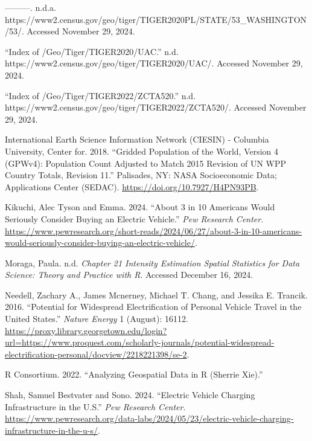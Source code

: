 \documentclass[
  letterpaper,
  DIV=11,
  numbers=noendperiod]{scrartcl}
\newlength{\cslhangindent}
\newenvironment{CSLReferences}[2] %
 {\begin{list}{}{%
  \setlength{\itemindent}{0pt}
  \setlength{\leftmargin}{0pt}
  \setlength{\parsep}{0pt}
  \ifodd #1
   \setlength{\leftmargin}{\cslhangindent}
   \setlength{\itemindent}{-1\cslhangindent}
  \fi
  \setlength{\itemsep}{#2\baselineskip}}}
 {\end{list}}
\begin{document}
\begin{CSLReferences}{1}{0}
---------. n.d.a.
https://www2.census.gov/geo/tiger/TIGER2020PL/STATE/53\_WASHINGTON/53/.
Accessed November 29, 2024.

{``Index of /Geo/Tiger/{TIGER2020}/{UAC}.''} n.d.
https://www2.census.gov/geo/tiger/TIGER2020/UAC/. Accessed November 29,
2024.

{``Index of /Geo/Tiger/{TIGER2022}/{ZCTA520}.''} n.d.
https://www2.census.gov/geo/tiger/TIGER2022/ZCTA520/. Accessed November
29, 2024.

International Earth Science Information Network (CIESIN) - Columbia
University, Center for. 2018. {``Gridded Population of the World,
Version 4 (GPWv4): Population Count Adjusted to Match 2015 Revision of
UN WPP Country Totals, Revision 11.''} Palisades, NY: NASA Socioeconomic
Data; Applications Center (SEDAC).
\url{https://doi.org/10.7927/H4PN93PB}.

Kikuchi, Alec Tyson and Emma. 2024. {``About 3 in 10 {Americans} Would
Seriously Consider Buying an Electric Vehicle.''} \emph{Pew Research
Center}.
\url{https://www.pewresearch.org/short-reads/2024/06/27/about-3-in-10-americans-would-seriously-consider-buying-an-electric-vehicle/}.

Moraga, Paula. n.d. \emph{Chapter 21 {Intensity} Estimation {\textbar}
{Spatial Statistics} for {Data Science}: {Theory} and {Practice} with
{R}}. Accessed December 16, 2024.

Needell, Zachary A., James Mcnerney, Michael T. Chang, and Jessika E.
Trancik. 2016. {``Potential for Widespread Electrification of Personal
Vehicle Travel in the United States.''} \emph{Nature Energy} 1 (August):
16112.
\url{https://proxy.library.georgetown.edu/login?url=https://www.proquest.com/scholarly-journals/potential-widespread-electrification-personal/docview/2218221398/se-2}.

R Consortium. 2022. {``Analyzing {Geospatial Data} in {R} ({Sherrie
Xie}).''}

Shah, Samuel Bestvater and Sono. 2024. {``Electric {Vehicle Charging
Infrastructure} in the {U}.{S}.''} \emph{Pew Research Center}.
\url{https://www.pewresearch.org/data-labs/2024/05/23/electric-vehicle-charging-infrastructure-in-the-u-s/}.

\end{CSLReferences}
\end{document}
